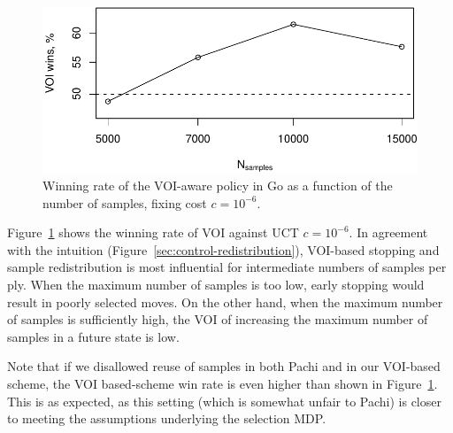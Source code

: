 \documentclass[]{article}
\newcommand{\figref}[1]{Figure~\ref{#1}}
\begin{document}
\begin{figure}[h!]
\centering
\includegraphics[scale=0.55]{voi-wins.pdf}
\caption{Winning rate of the VOI-aware policy in Go as a function of the number of samples, fixing cost $c=10^{-6}$.}
\label{fig:voi-wins}
\end{figure}

\figref{fig:voi-wins}
shows the winning rate of VOI against UCT $c=10^{-6}$. In agreement with the intuition
(\figref{sec:control-redistribution}), VOI-based stopping and
sample redistribution is most influential for intermediate numbers of
samples per ply. When the maximum number of samples is too low, early
stopping would result in poorly selected moves. On the other hand,
when the maximum number of samples is sufficiently high, the VOI of
increasing the maximum number of samples in a future state is low.

Note that if we disallowed reuse of samples in both Pachi and
in our VOI-based scheme, the VOI based-scheme
win rate is even higher than shown in \figref{fig:voi-wins}. This is as expected,
as this setting (which is somewhat unfair to Pachi) is closer to
meeting the assumptions underlying the selection MDP.










\end{document}
